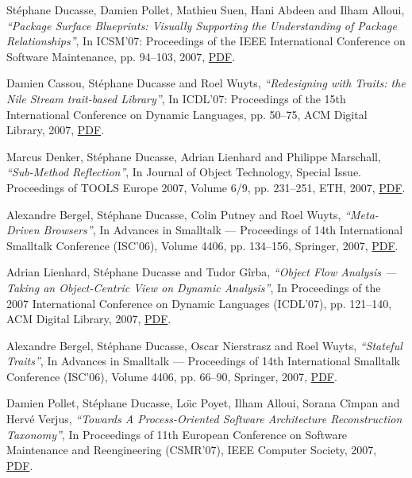 \documentclass{article}
\newcommand{\czauthors}[1]{#1}
\newcommand{\cztitle}[1]{\emph{``#1''}}
\newcommand{\czbooktitle}[1]{#1}
\begin{document}
\begin{itemize}
	\pub  \czauthors{St\'ephane Ducasse, Damien Pollet, Mathieu Suen, Hani Abdeen and Ilham Alloui},  \cztitle{Package Surface Blueprints: Visually Supporting the Understanding of Package Relationships},  In \czbooktitle{ICSM'07: Proceedings of the IEEE International Conference on Software Maintenance}, pp. 94--103, 2007, \href{http://rmod-files.lille.inria.fr/Team/Texts/Papers/Duca07cPackageBlueprintICSM2007.pdf}{PDF}.

	\pub  \czauthors{Damien Cassou, St\'ephane Ducasse and Roel Wuyts},  \cztitle{Redesigning with Traits: the {Nile} Stream trait-based Library},  In \czbooktitle{ICDL'07: Proceedings of the 15th International Conference on Dynamic Languages}, pp. 50--75, ACM Digital Library, 2007, \href{http://rmod-files.lille.inria.fr/Team/Texts/Papers/Cass07a-TraitsStreamRedesign-ICDL.pdf}{PDF}.

	\pub  \czauthors{Marcus Denker, St\'ephane Ducasse, Adrian Lienhard and Philippe Marschall},  \cztitle{Sub-Method Reflection},  In \czbooktitle{Journal of Object Technology, Special Issue. Proceedings of TOOLS Europe 2007}, Volume 6/9, pp. 231--251, ETH, 2007, \href{http://rmod-files.lille.inria.fr/Team/Texts/Papers/Denk07b-TOOLS07-Submethod.pdf}{PDF}.

	\pub  \czauthors{Alexandre Bergel, St\'ephane Ducasse, Colin Putney and Roel Wuyts},  \cztitle{Meta-Driven Browsers},  In \czbooktitle{Advances in Smalltalk --- Proceedings of 14th International Smalltalk Conference (ISC'06)}, Volume 4406, pp. 134--156, Springer, 2007, \href{http://rmod-files.lille.inria.fr/Team/Texts/Papers/Berg07cOmnibrowser.pdf}{PDF}.

	\pub  \czauthors{Adrian Lienhard, St\'ephane Ducasse and Tudor G\^irba},  \cztitle{Object Flow Analysis --- Taking an Object-Centric View on Dynamic Analysis},  In \czbooktitle{Proceedings of the 2007 International Conference on Dynamic Languages (ICDL'07)}, pp. 121--140, ACM Digital Library, 2007, \href{http://rmod-files.lille.inria.fr/Team/Texts/Papers/Lien07c-ObjectFlowAnalysis.pdf}{PDF}.

	\pub  \czauthors{Alexandre Bergel, St\'ephane Ducasse, Oscar Nierstrasz and Roel Wuyts},  \cztitle{Stateful Traits},  In \czbooktitle{Advances in Smalltalk --- Proceedings of 14th International Smalltalk Conference (ISC'06)}, Volume 4406, pp. 66--90, Springer, 2007, \href{http://rmod-files.lille.inria.fr/Team/Texts/Papers/Berg07a-InternationalSmalltalkConference07-StatefulTraits.pdf}{PDF}.

	\pub  \czauthors{Damien Pollet, St\'ephane Ducasse, Lo\"{\i}c Poyet, Ilham Alloui, Sorana C\^impan and Herv\'e Verjus},  \cztitle{Towards A Process-Oriented Software Architecture Reconstruction Taxonomy},  In \czbooktitle{Proceedings of 11th European Conference on Software Maintenance and Reengineering (CSMR'07)}, IEEE Computer Society, 2007, \href{http://rmod-files.lille.inria.fr/Team/Texts/Papers/Poll07a-CSMRSARTaxonomy.pdf}{PDF}.


\end{itemize}
\end{document}
